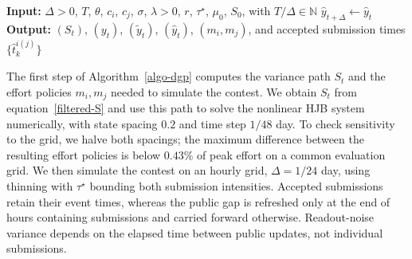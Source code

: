 \documentclass[mnsc]{informs3}
\begin{document}
\begin{algorithm}[htbp]
\caption{Synthetic Data Simulation}
\label{algo-dgp}
\begin{algorithmic}
	\STATE \textbf{Input:}
		{$\Delta>0$, $T$, $\theta$, $c_i$, $c_j$, $\sigma$, $\lambda>0$, $r$, $\tau^\star$, $\mu_0$, $S_0$, with $T/\Delta\in\mathbb N$}
	\STATE {Sample rate-$\tau^\star$ Poisson candidate sets $\mathcal C_i,\mathcal C_j$ on $[0,T)$.}
    \STATE $\hat y_{t+\Delta}\gets\hat y_t$
	\FOR{{each player $k\in\{i,j\}$ and candidate $s\in\mathcal C_k\cap[t,t+\Delta)$, chronologically}}
        \ENDIF
    \ENDFOR
    \ENDIF
\ENDFOR
\STATE \textbf{Output:} {$(S_t)$, $(y_t)$, $(\tilde y_t)$, $(\hat y_t)$, $(m_i,m_j)$, and accepted submission times $\{\hat t_k^{i(j)}\}$}
\end{algorithmic}
\end{algorithm}

{The first step of Algorithm~\ref{algo-dgp} computes the variance path $S_t$ and the effort policies $m_i,m_j$ needed to simulate the contest. We obtain $S_t$ from equation~\eqref{filtered-S} and use this path to solve the nonlinear HJB system numerically, with state spacing $0.2$ and time step $1/48$ day. To check sensitivity to the grid, we halve both spacings; the maximum difference between the resulting effort policies is below $0.43\%$ of peak effort on a common evaluation grid. We then simulate the contest on an hourly grid, $\Delta=1/24$ day, using thinning \citep{lewis1979simulation} with $\tau^\star$ bounding both submission intensities. Accepted submissions retain their event times, whereas the public gap is refreshed only at the end of hours containing submissions and carried forward otherwise. Readout-noise variance depends on the elapsed time between public updates, not individual submissions.}
\end{document}

